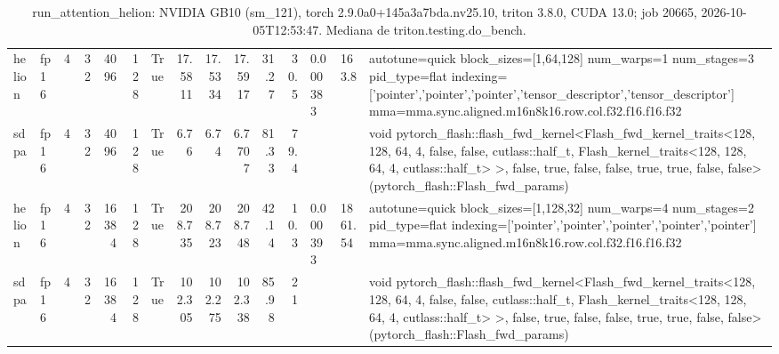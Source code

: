 \begin{table}[htbp]
\begin{tabular}{llrrrrlrrrrrlll}
    helion & fp16 & 4 & 32 & 4096 & 128 & True & 17.5811 & 17.5334 & 17.5917 & 31.27 & 30.5 & 0.000383 & 163.8 & autotune=quick block\_sizes=[1,64,128] num\_warps=1 num\_stages=3 pid\_type=flat indexing=['pointer','pointer','pointer','tensor\_descriptor','tensor\_descriptor'] mma=mma.sync.aligned.m16n8k16.row.col.f32.f16.f16.f32 \\
    sdpa & fp16 & 4 & 32 & 4096 & 128 & True & 6.76 & 6.74 & 6.7707 & 81.33 & 79.4 &  &  & void pytorch\_flash::flash\_fwd\_kernel<Flash\_fwd\_kernel\_traits<128, 128, 64, 4, false, false, cutlass::half\_t, Flash\_kernel\_traits<128, 128, 64, 4, cutlass::half\_t> >, false, true, false, false, true, true, false, false>(pytorch\_flash::Flash\_fwd\_params) \\
    helion & fp16 & 4 & 32 & 16384 & 128 & True & 208.735 & 208.723 & 208.748 & 42.14 & 10.3 & 0.000393 & 1861.54 & autotune=quick block\_sizes=[1,128,32] num\_warps=4 num\_stages=2 pid\_type=flat indexing=['pointer','pointer','pointer','pointer','pointer'] mma=mma.sync.aligned.m16n8k16.row.col.f32.f16.f16.f32 \\
    sdpa & fp16 & 4 & 32 & 16384 & 128 & True & 102.305 & 102.275 & 102.338 & 85.98 & 21 &  &  & void pytorch\_flash::flash\_fwd\_kernel<Flash\_fwd\_kernel\_traits<128, 128, 64, 4, false, false, cutlass::half\_t, Flash\_kernel\_traits<128, 128, 64, 4, cutlass::half\_t> >, false, true, false, false, true, true, false, false>(pytorch\_flash::Flash\_fwd\_params) \\
    \bottomrule
  \end{tabular}
  \caption{run\_attention\_helion: NVIDIA GB10 (sm\_121), torch 2.9.0a0+145a3a7bda.nv25.10, triton 3.8.0, CUDA 13.0; job 20665, 2026-10-05T12:53:47. Mediana de triton.testing.do\_bench.}
  \label{tab:hennessy-run-attention-helion}
\end{table}
